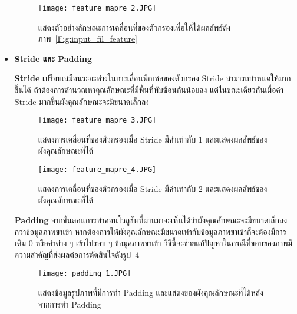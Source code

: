 \begin{itemize}
    \begin{figure}[h]
        \centering
        \texttt{[image: feature\_mapre\_2.JPG]}
        \caption{แสดงตัวอย่างลักษณะการเคลื่อนที่ของตัวกรองเพื่อให้ได้ผลลัพธ์ดังภาพ~\ref{Fig:input_fil_feature}}
        \label{Fig:feature_stride_eg_1}
    \end{figure}
    
    \item \textbf{Stride และ Padding} \par
    
    \textbf{Stride} เปรียบเสมือนระยะห่างในการเลื่อนพิกเซลของตัวกรอง Stride สามารถกำหนดให้มากขึ้นได้ 
    ถ้าต้องการคำนวณหาคุณลักษณะที่มีพื้นที่ทับซ้อนกันน้อยลง แต่ในขณะเดียวกันเมื่อค่า Stride มากขึ้นผังคุณลักษณะจะมีขนาดเล็กลง

    \begin{figure}[h]
        \centering
        \texttt{[image: feature\_mapre\_3.JPG]}
        \caption{แสดงการเคลื่อนที่ของตัวกรองเมื่อ Stride มีค่าเท่ากับ 1 และแสดงผลลัพธ์ของผังคุณลักษณะที่ได้}
        \label{Fig:feature_stride_eg_2}
    \end{figure}
    \begin{figure}[h]
        \centering
        \texttt{[image: feature\_mapre\_4.JPG]}
        \caption{แสดงการเคลื่อนที่ของตัวกรองเมื่อ Stride มีค่าเท่ากับ 2 และแสดงผลลัพธ์ของผังคุณลักษณะที่ได้}
        \label{Fig:feature_stride_eg_3}
    \end{figure}
    \FloatBarrier

    \textbf{Padding} จากขั้นตอนการทำคอนโวลูชันที่ผ่านมาจะเห็นได้ว่าผังคุณลักษณะจะมีขนาดเล็กลงกว่าข้อมูลภาพขาเข้า 
    หากต้องการให้ผังคุณลักษณะมีขนาดเท่ากับข้อมูลภาพขาเข้าก็จะต้องมีการเติม 0 หรือค่าต่าง ๆ เข้าไปรอบ ๆ ข้อมูลภาพขาเข้า 
    วิธีนี้จะช่วยแก้ปัญหาในกรณีที่ขอบของภาพมีความสำคัญที่ส่งผลต่อการตัดสินใจดังรูป~\ref{Fig:padding_1}

    \begin{figure}[h]
        \centering
        \texttt{[image: padding\_1.JPG]}
        \caption{แสดงข้อมูลรูปภาพที่มีการทำ Padding และแสดงของผังคุณลักษณะที่ได้หลังจากการทำ Padding}
        \label{Fig:padding_1}
    \end{figure}
    

\end{itemize}
